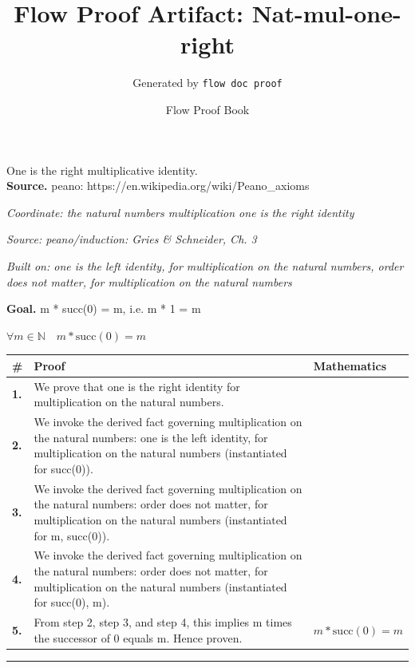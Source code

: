 \documentclass[11pt]{article}
\title{Flow Proof Artifact: Nat-mul-one-right}
\author{Generated by \texttt{flow doc proof}}
\date{Flow Proof Book}
\theoremstyle{definition}
\begin{document}
\maketitle
One is the right multiplicative identity.\\[0.5em]
\textbf{Source.} peano: https://en.wikipedia.org/wiki/Peano\_axioms\\[0.5em]
\bigskip
{}\par
\smallskip\noindent\textit{Coordinate: the natural numbers \cdot multiplication \cdot one is the right identity}\par
\smallskip\noindent\textit{Source: peano/induction: Gries \& Schneider, Ch. 3}\par
\smallskip\noindent\textit{Built on: one is the left identity, for multiplication on the natural numbers, order does not matter, for multiplication on the natural numbers}\par
\medskip
\noindent\textbf{Goal.} m * succ(0) = m, i.e. m * 1 = m\par
\noindent$\displaystyle \forall m \in \mathbb{N}\quad m * \mathrm{succ}(0) = m$\par
\medskip
\noindent
\begin{tabular}{@{} >{\raggedright\arraybackslash}p{} >{\raggedright\arraybackslash}p{} >{\raggedleft\arraybackslash}p{} @{}}
\textbf{\#} & \textbf{Proof} & \textbf{Mathematics} \\
\midrule
\textbf{1.} & We prove that one is the right identity for multiplication on the natural numbers. & \\[0.45em]
\textbf{2.} & We invoke the derived fact governing multiplication on the natural numbers: one is the left identity, for multiplication on the natural numbers (instantiated for succ(0)). & \\[0.45em]
\textbf{3.} & We invoke the derived fact governing multiplication on the natural numbers: order does not matter, for multiplication on the natural numbers (instantiated for m, succ(0)). & \\[0.45em]
\textbf{4.} & We invoke the derived fact governing multiplication on the natural numbers: order does not matter, for multiplication on the natural numbers (instantiated for succ(0), m). & \\[0.45em]
\textbf{5.} & From step 2, step 3, and step 4, this implies m times the successor of 0 equals m. Hence proven. & $\displaystyle m * \mathrm{succ}(0) = m$ \\[0.45em]
\bottomrule
\end{tabular}
\label{thm:Nat-multiplication-one_is_the_right_identity}
\par\medskip\hrule
\end{document}
